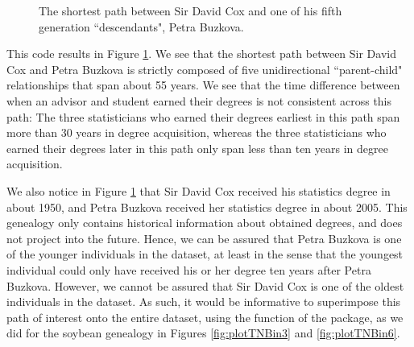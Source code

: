 \documentclass[article,shortnames]{jss}
\begin{document}
\begin{figure}[H]
    \centering
    \caption{The shortest path between Sir David Cox and one of his fifth generation ``descendants", Petra Buzkova.}
    \label{fig:pathCB}
\end{figure}

This code results in Figure \ref{fig:pathCB}. We see that the shortest path between Sir David Cox and Petra Buzkova is strictly composed of five unidirectional ``parent-child" relationships that span about 55 years. We see that the time difference between when an advisor and student earned their degrees is not consistent across this path: The three statisticians who earned their degrees earliest in this path span more than 30 years in degree acquisition, whereas the three statisticians who earned their degrees later in this path only span less than ten years in degree acquisition.

We also notice in Figure \ref{fig:pathCB} that Sir David Cox received his statistics degree in about 1950, and Petra Buzkova received her statistics degree in about 2005. This genealogy only contains historical information about obtained degrees, and does not project into the future. Hence, we can be assured that Petra Buzkova is one of the younger individuals in the dataset, at least in the sense that the youngest individual could only have received his or her degree ten years after Petra Buzkova. However, we cannot be assured that Sir David Cox is one of the oldest individuals in the dataset. As such, it would be informative to superimpose this path of interest onto the entire dataset, using the  function of the  package, as we did for the soybean genealogy in Figures \ref{fig:plotTNBin3} and \ref{fig:plotTNBin6}.
\end{document}
